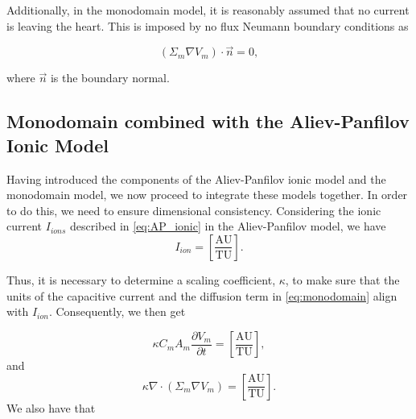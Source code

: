 Additionally, in the monodomain model, it is reasonably assumed that no current is leaving the heart. This is imposed by no flux Neumann boundary conditions as

\begin{equation}
    \label{eq:no_flux}
    (\Sigma_m\nabla V_m)\cdot \vec{n}=0,
\end{equation}

where $\Vec{n}$ is the boundary normal.


\subsection{Monodomain combined with the Aliev-Panfilov Ionic Model}\label{mono_aliev}

Having introduced the components of the Aliev-Panfilov ionic model and the monodomain model, we now proceed to integrate these models together. In order to do this, we need to ensure dimensional consistency. Considering the ionic current $I_{ions}$ described in \eqref{eq:AP_ionic} in the Aliev-Panfilov model, we have
\begin{equation}
    I_{ion}=\left[\frac{\mathrm{AU}}{\mathrm{TU}}\right].
\end{equation}

Thus, it is necessary to determine a scaling coefficient, $\kappa$, to make sure that the units of the capacitive current and the diffusion term in \eqref{eq:monodomain} align with $I_{ion}$. Consequently, we then get

\begin{equation}
\kappa C_mA_m\frac{\partial V_m}{\partial t}=\left[\frac{\mathrm{AU}}{\mathrm{TU}}\right],
\label{eq:scale_cap}
\end{equation}
and
\begin{equation}
\kappa\nabla \cdot (\Sigma_m \nabla V_m)=\left[\frac{\mathrm{AU}}{\mathrm{TU}}\right].
\label{eq:scale_dif}
\end{equation}
We also have that

